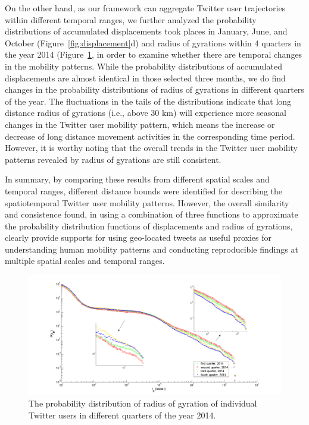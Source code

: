 \documentclass[ijgi,article,accept,moreauthors,pdftex,10pt,a4paper]{mdpi}
\theoremstyle{mdpi}
\newcounter{ex}
\newcounter{re}
\theoremstyle{mdpidefinition}
\begin{document}
On the other hand, as our framework can aggregate Twitter user trajectories within different temporal ranges, we further analyzed the probability distributions of accumulated displacements took places in January, June, and October (Figure~\ref{fig:displacement}d) and radius of gyrations within 4 quarters in the year 2014 (Figure~\ref{fig:gyration_season}, in order to examine whether there are temporal changes in the mobility patterns.
While the probability distributions of accumulated displacements are almost identical in those selected three months,  we do find changes in the probability distributions of radius of gyrations in different quarters of the year. 
The fluctuations in the tails of the distributions indicate that long distance radius of gyrations (i.e., above 30 km) will experience more seasonal changes in the Twitter user mobility pattern, which means the increase or decrease of long distance movement activities in the corresponding time period. 
However, it is worthy noting that the overall trends in the Twitter user mobility patterns revealed by radius of gyrations are still consistent.

In summary, by comparing these results from different spatial scales and temporal ranges, different distance bounds were identified for describing the spatiotemporal Twitter user mobility patterns.
However, the overall similarity and consistence found, in using a combination of three functions to approximate the probability distribution functions of displacements and radius of gyrations, clearly provide supports for using geo-located tweets as useful proxies for understanding human mobility patterns and conducting reproducible findings at multiple spatial scales and temporal ranges.
 
\begin{figure}[ht]
\centering
\includegraphics[width=1.0\linewidth]{./figures/gyration_season}
\caption{The probability distribution of radius of gyration of individual Twitter users in different quarters of the year 2014.}
\label{fig:gyration_season}
\end{figure}
\FloatBarrier
\end{document}
